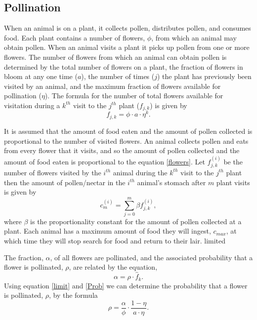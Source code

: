 \subsection{Pollination}
  When an animal is on a plant, it collects pollen, distributes pollen, and consumes food. Each
  plant contains a number of flowers, $\phi$, from which an animal may obtain pollen. When an animal
  visits a plant it picks up pollen from one or more flowers. The number of flowers from which an
  animal can obtain pollen is determined by the total number of flowers on a plant, the fraction of
  flowers in bloom at any one time ($a$), the number of times ($j$) the plant has previously been
  visited by an animal, and the maximum fraction of flowers available for pollination ($\eta$). The
  formula for the number of total flowers available for visitation during a $k^{th}$ visit to the
  $j^{th}$ plant ($f_{j,k}$) is given by
  \begin{equation}\label{flowers}
    f_{j,k} = \phi \cdot a \cdot \eta^k.
  \end{equation}

  It is assumed that the amount of food eaten and the amount of pollen collected is proportional to
  the number of visited flowers. An animal collects pollen and eats from every flower that it
  visits, and so the amount of pollen collected and the amount of food eaten is proportional to the
  equation \eqref{flowers}. Let $f^{\left(i\right)}_{j,k}$ be the number of flowers visited by the
  $i^{th}$ animal during the $k^{th}$ visit to the $j^{th}$ plant then the amount of pollen/nectar
  in the $i^{th}$ animal's stomach after $m$ plant visits is given by
  \begin{equation}
    c^{\left(i\right)}_m = \sum_{j=0}^{m} \beta f^{\left(i\right)}_{j,k},
    \label{limit}
  \end{equation}
  where $\beta$ is the proportionality constant for the amount of pollen collected at a plant.
  Each animal has a maximum amount of food they will ingest, $c_{max}$, at which time they will stop
  search for food and return to their lair. %
  limited

  The fraction, $\alpha$, of all flowers are pollinated, and the associated probability that a
  flower is pollinated, $\rho$, are related by the equation,
  \begin{equation} \label{Prob}
    \alpha = \rho \cdot \hat{f}_k.
  \end{equation}
  Using equation \eqref{limit} and \eqref{Prob} we can determine the probability that a flower is
  pollinated, $\rho$, by the formula
  \[
    \rho = \frac{\alpha}{\phi} \cdot \frac{1 - \eta}{a \cdot \eta}.
  \]

